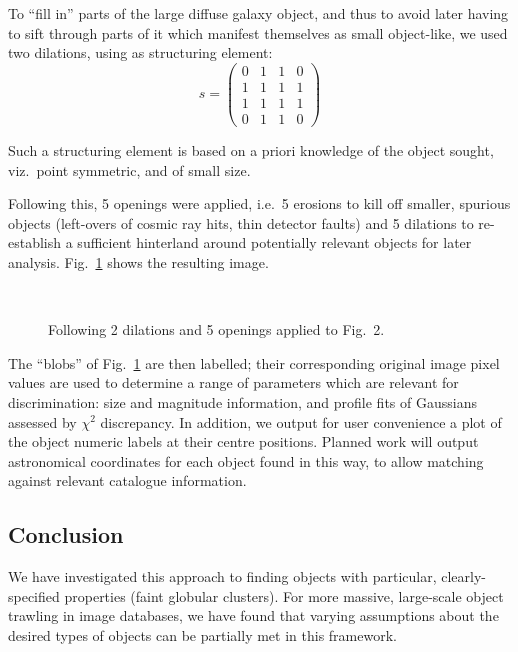 To ``fill in'' parts of the large diffuse galaxy object, and thus to avoid 
later having to sift through parts of it which manifest themselves as
small object-like, we used two dilations, using as structuring element:
$$ s = \left(     \begin{array}{cccc}
          0 & 1 & 1 & 0  \\
          1 & 1 & 1 & 1  \\
          1 & 1 & 1 & 1  \\
          0 & 1 & 1 & 0  
         \end{array}    \right)
$$

Such a structuring element is based on a priori knowledge of the object
sought, viz.\ point symmetric, and of small size.  

Following this, 5 openings were applied, i.e.\ 5 erosions to kill off smaller,
spurious objects (left-overs of cosmic ray hits, thin detector faults) and 
5 dilations to re-establish a sufficient hinterland around potentially 
relevant objects for later analysis.  Fig.\ \ref{ch102d5o} shows the 
resulting image.

\begin{figure}[h]
\centerline{
\hbox{
}}
\caption{Following 2 dilations and 5 openings applied to Fig.\ 2.}
\label{ch102d5o}
\end{figure}

The ``blobs'' of Fig.\ \ref{ch102d5o} are then labelled; their corresponding
original image pixel values are used to determine a range of parameters which
are relevant for discrimination: size and magnitude information, and profile 
fits of Gaussians assessed by $\chi^2$ discrepancy.  In addition, we output
for user convenience a plot of the object numeric labels at their centre 
positions.  Planned work will output astronomical coordinates for each object
found in this way, to allow matching against relevant catalogue information.

\subsection{Conclusion}

We have investigated this approach to finding objects with particular, 
clearly-specified properties (faint globular clusters).  For more massive,
large-scale object trawling in image databases, we have found that varying 
assumptions about
the desired types of objects can be partially met in this framework.  

